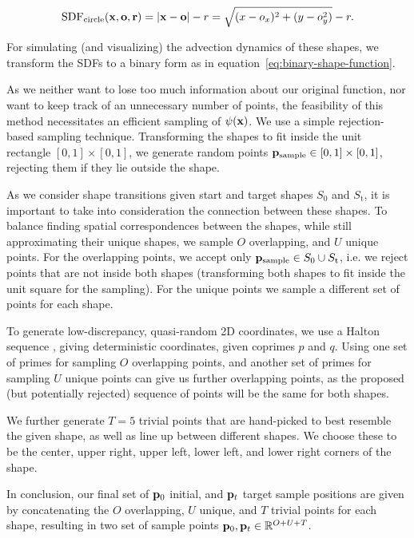 $$\text{SDF}_{\text{circle}}(\vb{x, \vb{o}, r}) 
  = \abs{\vb{x}-\vb{o}} - r
  = \sqrt{(x-o_x)^2 + (y-o_y^2)} - r.$$

For simulating (and visualizing) the advection dynamics of these shapes, we
transform the SDFs to a binary form as in
equation~\eqref{eq:binary-shape-function}.

As we neither want to lose too much information about our original function, nor
want to keep track of an unnecessary number of points, the feasibility of this
method necessitates an efficient sampling of $\psi(\vb{x})$. We use a simple
rejection-based sampling technique. Transforming the shapes to fit inside the
unit rectangle $[0,1]\times[0,1]$, we generate random points
$\vb{p}_\text{sample}\in [0,1]\times[0,1]$, rejecting them if they lie outside
the shape.

As we consider shape transitions given start and target shapes $S_\text{0}$ and
$S_\text{t}$, it is important to take into consideration the connection between
these shapes. To balance finding spatial correspondences between the shapes,
while still approximating their unique shapes, we sample $O$ overlapping, and
$U$ unique points. For the overlapping points, we accept only
$\vb{p}_\text{sample} \in S_\text{0} \cup S_\text{t}$, i.e. we reject points
that are not inside both shapes (transforming both shapes to fit inside the unit
square for the sampling). For the unique points we sample a different set of
points for each shape. 

To generate low-discrepancy, quasi-random 2D coordinates, we use a Halton
sequence \cite{halton}, giving deterministic coordinates, given coprimes $p$
and $q$. Using one set of primes for sampling $O$ overlapping points, and
another set of primes for sampling $U$ unique points can give us further
overlapping points, as the proposed (but potentially rejected) sequence of
points will be the same for both shapes.

We further generate $T=5$ trivial points that are hand-picked to best resemble
the given shape, as well as line up between different shapes. We choose these to
be the center, upper right, upper left, lower left, and lower right corners of
the shape. 

In conclusion, our final set of $\vb{p}_0$ initial, and $\vb{p}_t$ target sample
positions are given by concatenating the $O$ overlapping, $U$ unique, and $T$
trivial points for each shape, resulting in two set of sample points $\vb{p}_0,
\vb{p}_t \in \mathbb{R}^{O+U+T}$.

